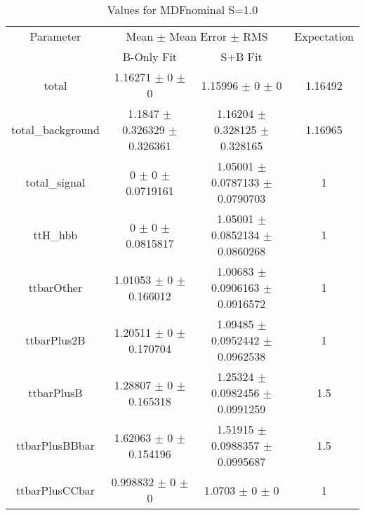 \begin{table}
\centering
\caption{Values for MDFnominal S=1.0}
\begin{tabular}{cccc}
\toprule
Parameter & \multicolumn{2}{c}{Mean $\pm$ Mean Error $\pm$ RMS} & Expectation\\
 & B-Only Fit & S+B Fit & \\
\midrule
total & \num{1.16271} $\pm$ \num{0} $\pm$ \num{0} & \num{1.15996} $\pm$ \num{0} $\pm$ \num{0} & \num{1.16492}\\
total\_background & \num{1.1847} $\pm$ \num{0.326329} $\pm$ \num{0.326361} & \num{1.16204} $\pm$ \num{0.328125} $\pm$ \num{0.328165} & \num{1.16965}\\
total\_signal & \num{0} $\pm$ \num{0} $\pm$ \num{0.0719161} & \num{1.05001} $\pm$ \num{0.0787133} $\pm$ \num{0.0790703} & \num{1}\\
ttH\_hbb & \num{0} $\pm$ \num{0} $\pm$ \num{0.0815817} & \num{1.05001} $\pm$ \num{0.0852134} $\pm$ \num{0.0860268} & \num{1}\\
ttbarOther & \num{1.01053} $\pm$ \num{0} $\pm$ \num{0.166012} & \num{1.00683} $\pm$ \num{0.0906163} $\pm$ \num{0.0916572} & \num{1}\\
ttbarPlus2B & \num{1.20511} $\pm$ \num{0} $\pm$ \num{0.170704} & \num{1.09485} $\pm$ \num{0.0952442} $\pm$ \num{0.0962538} & \num{1}\\
ttbarPlusB & \num{1.28807} $\pm$ \num{0} $\pm$ \num{0.165318} & \num{1.25324} $\pm$ \num{0.0982456} $\pm$ \num{0.0991259} & \num{1.5}\\
ttbarPlusBBbar & \num{1.62063} $\pm$ \num{0} $\pm$ \num{0.154196} & \num{1.51915} $\pm$ \num{0.0988357} $\pm$ \num{0.0995687} & \num{1.5}\\
ttbarPlusCCbar & \num{0.998832} $\pm$ \num{0} $\pm$ \num{0} & \num{1.0703} $\pm$ \num{0} $\pm$ \num{0} & \num{1}\\
\bottomrule
\end{tabular}
\end{table}